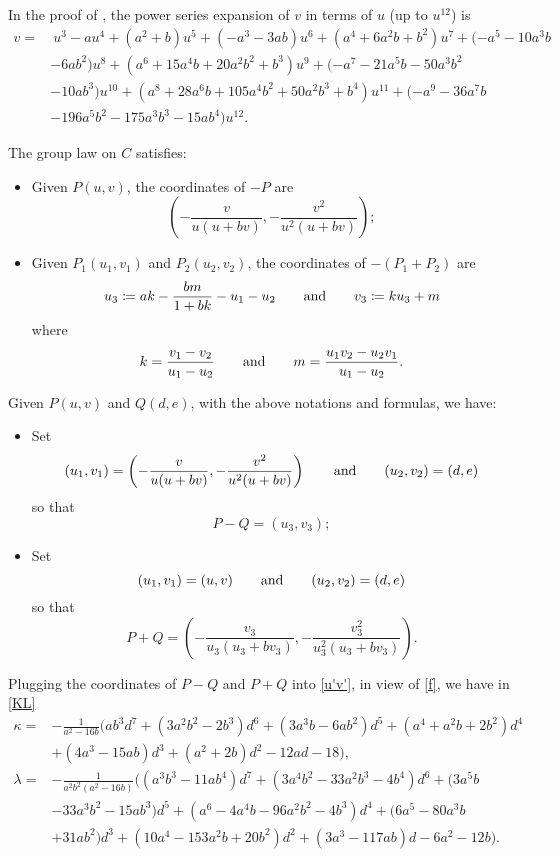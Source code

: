 \documentclass[microtype]{gtpart}     %
\theoremstyle{remark}
\theoremstyle{definition}
\newcommand{\ad}{{\rm and}}
\newcommand{\ce}{\coloneqq}
\newcommand{\K}{\kappa}
\begin{document}
In the proof of , the power series expansion of $v$ in 
terms of $u$ (up to $u^{12}$) is 
\begin{equation*}
\begin{split}
 v = & ~ u^3 - a u^4 + (a^2 + b) u^5 + (-a^3 - 3 a b) u^6 + (a^4 + 6 a^2 b + b^2) u^7 + (-a^5 - 10 a^3 b \\
     & - 6 a b^2) u^8 + (a^6 + 15 a^4 b + 20 a^2 b^2 + b^3) u^9 + (-a^7 - 21 a^5 b - 50 a^3 b^2 \\
     & - 10 a b^3) u^{10} + (a^8 + 28 a^6 b + 105 a^4 b^2 + 50 a^2 b^3 + b^4) u^{11} + (-a^9 - 36 a^7 b \\
     & - 196 a^5 b^2 - 175 a^3 b^3 - 15 a b^4) u^{12}.  
\end{split}
\end{equation*}

The group law on $C$ satisfies: 
\begin{itemize}
 \item Given $P(u,v)$, the coordinates of $-P$ are 
 \[
  \left( -\frac{v}{u (u + b v)},-\frac{v^2}{u^2 (u + b v)} \right); 
 \]

 \item Given $P_1(u_1,v_1)$ and $P_2(u_2,v_2)$, the coordinates of 
 $-(P_1 + P_2)$ are 
 \[
  u_3 \ce a k - \frac{b m}{1 + b k} - u_1 - u_2 \qquad \ad \qquad v_3 \ce k u_3 + m 
 \]
 where 
 \[
  k = \frac{v_1 - v_2}{u_1 - u_2} \qquad \ad \qquad m = \frac{u_1 v_2 - u_2 v_1}{u_1 - u_2}.  
 \]
\end{itemize}
Given $P(u,v)$ and $Q(d,e)$, with the above notations and formulas, we have: 
\begin{itemize}
 \item Set 
 \[
  (u_1,v_1) = \left( -\frac{v}{u (u + b v)},-\frac{v^2}{u^2 (u + b v)} \right) \qquad \ad \qquad (u_2,v_2) = (d,e) 
 \]
 so that 
 \[
  P - Q = (u_3,v_3); 
 \]

 \item Set 
 \[
  (u_1,v_1) = (u,v) \qquad \ad \qquad (u_2,v_2) = (d,e) 
 \]
 so that 
 \[
  P + Q = \left( -\frac{v_3}{u_3 (u_3 + b v_3)},-\frac{v_3^2}{u_3^2 (u_3 + b v_3)} \right).  
 \]
\end{itemize}
Plugging the coordinates of $P - Q$ and $P + Q$ into \eqref{u'v'}, in view of 
\eqref{f}, we have in \eqref{KL} 
\begin{equation*}
\begin{split}
      \K = & -\frac{1}{a^2 - 16 b} \big( a b^3 d^7 + (3 a^2 b^2 - 2 b^3) d^6 + (3 a^3 b - 6 a b^2) d^5 + (a^4 + a^2 b + 2 b^2) d^4 \\
           & + (4 a^3 - 15 a b) d^3 + (a^2 + 2 b) d^2 - 12 a d - 18 \big), \\
 \lambda = & -\frac{1}{a^2 b^2 (a^2 - 16 b)} \big( (a^3  b^3 - 11 a b^4) d^7 + (3 a^4 b^2 - 33 a^2 b^3 - 4 b^4) d^6 + (3 a^5 b \\
           & - 33 a^3 b^2 - 15 a b^3) d^5 + (a^6 - 4 a^4 b - 96 a^2 b^2 - 4 b^3) d^4 + (6 a^5 - 80 a^3 b \\
           & + 31 a b^2) d^3 + (10 a^4 - 153 a^2 b + 20 b^2) d^2 + (3 a^3 - 117 a b) d - 6 a^2 - 12 b \big).  
\end{split}
\end{equation*}
\end{document}
